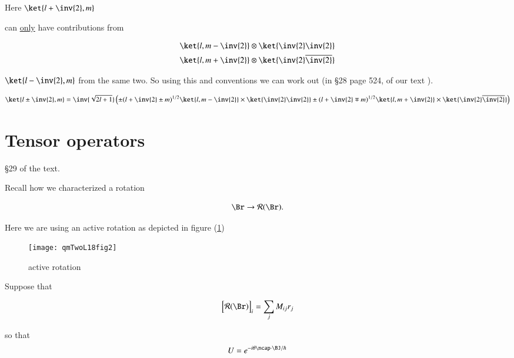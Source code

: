 Here $\ket{l + \inv{2}, m}$

can \underline{only} have contributions from 

\begin{align}\label{eqn:qmTwoL18:370}
\ket{l, m-\inv{2}} &\otimes \ket{\inv{2}\inv{2}} \\
\ket{l, m+\inv{2}} &\otimes \ket{\inv{2}\overline{\inv{2}}}
\end{align}

$\ket{l - \inv{2}, m}$ from the same two.  So using this and conventions we can work out (in \S 28 page 524, of our text \cite{desai2009quantum}).

\begin{equation}\label{eqn:qmTwoL18:390}
\ket{l\pm \inv{2}, m} =
\inv{\sqrt{2 l + 1}}
\left(
\pm (l + \inv{2} \pm m)^{1/2}
\ket{l, m - \inv{2}} \times \ket{\inv{2}\inv{2}}
\pm (l + \inv{2} \mp m)^{1/2}
\ket{l, m + \inv{2}} \times \ket{\inv{2} \overline{\inv{2}}}
\right)
\end{equation}

\section{Tensor operators}

\S 29 of the text.

Recall how we characterized a rotation

\begin{equation}\label{eqn:qmTwoL18:410}
\Br \rightarrow \mathcal{R}(\Br).
\end{equation}

Here we are using an active rotation as depicted in figure (\ref{fig:qmTwoL18:qmTwoL18fig2})

\begin{figure}[htp]
   \centering
   \texttt{[image: qmTwoL18fig2]}
   \caption{active rotation}\label{fig:qmTwoL18:qmTwoL18fig2}
\end{figure}

Suppose that 

\begin{equation}\label{eqn:qmTwoL18:430}
{\begin{bmatrix}
\mathcal{R}(\Br)
\end{bmatrix}
}_i
= 
\sum_j M_{ij} r_j
\end{equation}

so that
\begin{equation}\label{eqn:qmTwoL18:450}
U = e^{-i \theta \ncap \cdot \BJ/\hbar}
\end{equation}


